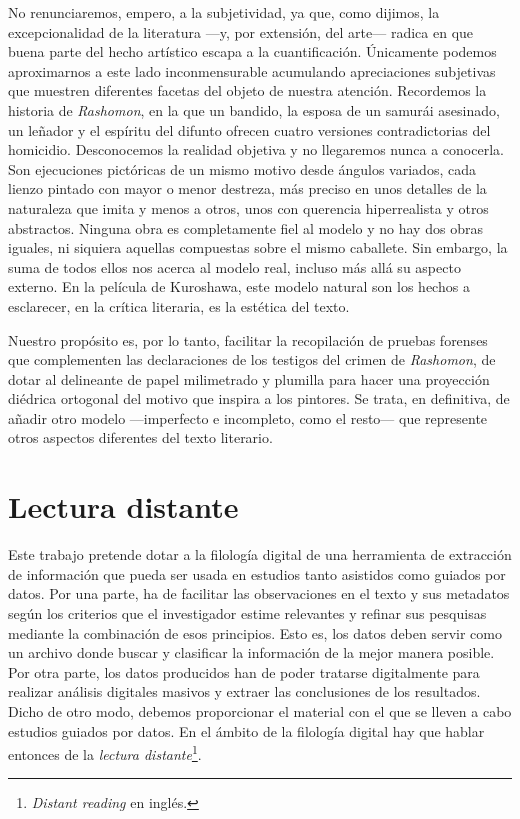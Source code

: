 No renunciaremos, empero, a la subjetividad, ya que, como dijimos, la excepcionalidad de la literatura —y, por extensión, del arte— radica en que buena parte del hecho artístico escapa a la cuantificación. Únicamente podemos aproximarnos a este lado inconmensurable acumulando apreciaciones subjetivas que muestren diferentes facetas del objeto de nuestra atención. Recordemos la historia de \textit{Rashomon}, en la que un bandido, la esposa de un samurái asesinado, un leñador y el espíritu del difunto ofrecen cuatro versiones contradictorias del homicidio. Desconocemos la realidad objetiva y no llegaremos nunca a conocerla. Son ejecuciones pictóricas de un mismo motivo desde ángulos variados, cada lienzo pintado con mayor o menor destreza, más preciso en unos detalles de la naturaleza que imita y menos a otros, unos con querencia hiperrealista y otros abstractos. Ninguna obra es completamente fiel al modelo y no hay dos obras iguales, ni siquiera aquellas compuestas sobre el mismo caballete. Sin embargo, la suma de todos ellos nos acerca al modelo real, incluso más allá su aspecto externo. En la película de Kuroshawa, este modelo natural son los hechos a esclarecer, en la crítica literaria, es la estética del texto. 

Nuestro propósito es, por lo tanto, facilitar la recopilación de pruebas forenses que complementen  las declaraciones de los testigos del crimen de \textit{Rashomon}, de dotar al delineante de papel milimetrado y plumilla para hacer una proyección diédrica ortogonal del motivo que inspira a los pintores. Se trata, en definitiva, de añadir otro modelo —imperfecto e incompleto, como el resto— que represente otros aspectos diferentes del texto literario.

\section{Lectura distante}\label{sec:disread}
Este trabajo pretende dotar a la filología digital de una herramienta de extracción de información que pueda ser usada en estudios tanto asistidos como guiados por datos. Por una parte, ha de facilitar las observaciones en el texto y sus metadatos según los criterios que el investigador estime relevantes y refinar sus pesquisas mediante la combinación de esos principios. Esto es, los datos deben servir como un archivo donde buscar y clasificar la información de la mejor manera posible. Por otra parte, los datos producidos han de poder tratarse digitalmente para realizar análisis digitales masivos y extraer las conclusiones de los resultados. Dicho de otro modo, debemos proporcionar el material con el que se lleven a cabo estudios guiados por datos. En el ámbito de la filología digital hay que hablar entonces de la \textit{lectura distante}\footnote{\textit{Distant reading} en inglés.}.

